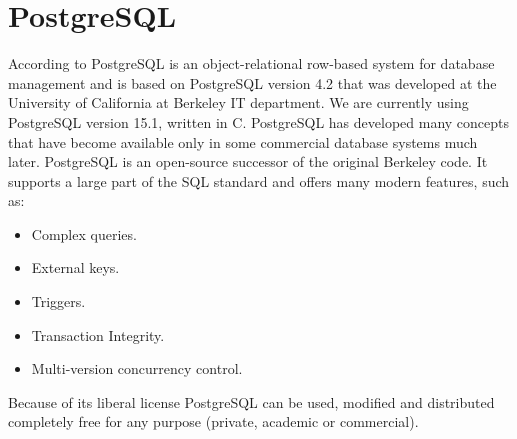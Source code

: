 \section{PostgreSQL}
\label{sec:postgres}





According to PostgreSQL is an object-relational row-based system for database management and is based on
PostgreSQL version 4.2 that was developed at the University of California at Berkeley IT department. 
We are currently using PostgreSQL version 15.1, written in C.
PostgreSQL has developed many concepts that have become available only in some commercial database
systems much later. PostgreSQL is an open-source successor of the original Berkeley code. It supports a
large part of the SQL standard and offers many modern features, such as:
\begin{itemize}
    \item Complex queries.
    \item External keys.
    \item Triggers.
    \item Transaction Integrity.
    \item Multi-version concurrency control.
\end{itemize}
Because of its liberal license PostgreSQL can be used, modified and distributed completely free for any purpose
(private, academic or commercial).